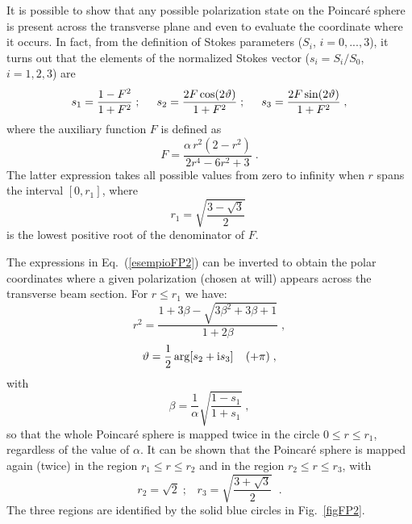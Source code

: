 \documentclass{article}
\begin{document}
It is possible to show that any possible polarization state on the Poincar\'e sphere is present across the transverse plane and even to evaluate the coordinate where it occurs. In fact, from the definition of Stokes parameters ($S_i$, $i=0,...,3$), it turns out that the elements of the normalized Stokes vector ($s_i=S_i/S_0$, $i=1,2,3$) are
%
\begin{equation}
s_1 = \displaystyle\frac{1-F^2}{1+F^2} \; ;
\hspace{.5cm}
s_2 = \displaystyle\frac{2 F \cos(2 \vartheta)}{1+F^2} \; ;
\hspace{.5cm}
s_3 = \displaystyle\frac{2 F \sin(2 \vartheta)}{1+F^2}
\; ,
\label{esempioFP2}
\end{equation}
%
where the auxiliary function $F$ is defined as 
%
\begin{equation}
F = \displaystyle\frac{\alpha \, r^2 \left( 2 - r^2\right)}{2 r^4 -6 r^2+3}
\; .
\label{esempioFP3}
\end{equation}
%
The latter expression takes all possible values from zero to infinity when $r$ spans the interval $[0, r_1]$, where
%
\begin{equation}
r_1= \sqrt{\displaystyle\frac{3-\sqrt{3}}{2}}\; 
\label{erre1}
\end{equation}
%
is the lowest positive root of the denominator of $F$.

The expressions in Eq.~(\ref{esempioFP2}) can be inverted to obtain the polar coordinates where a given polarization (chosen at will) appears across the transverse beam section. For $r\le r_1$ we have:
%
\begin{equation}
r^2=\dfrac{1+3 \beta-\sqrt{3 \beta^2+3 \beta+1}}{1+2 \beta} \; ,
\label{esempioFP4}
\end{equation}
%
%
\begin{equation}
\vartheta = \displaystyle\frac{1}{2} \arg[s_2 + {\rm i} s_3] \;\;\;\;(+ \pi)
\; ,
\label{esempioFP5}
\end{equation}
%
with
%
\begin{equation}
\beta=\frac{1}{\alpha}\sqrt{\dfrac{1-s_1}{1+s_1}} \; ,
\label{salpha}
\end{equation}
%
so that the whole Poincar\'e sphere is mapped twice in the circle $0 \le r \le r_1$, regardless of the value of $\alpha$. It can be shown that the Poincar\'e sphere is mapped again (twice) in the region $r_1 \le r \le r_2$ and in the region  $ r_2\le r \le r_3$, with
%
\begin{equation}
r_2=\sqrt{2} \; ; \;\;\;  r_3= \sqrt{\displaystyle\frac{3+\sqrt{3}}{2}}\; 
\; .
\label{erre}
\end{equation}
%
The three regions are identified by the solid blue circles in Fig.~\ref{figFP2}.
\end{document}
